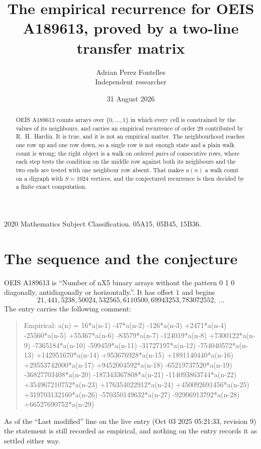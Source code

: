\documentclass[11pt,a4paper]{article}
\title{The empirical recurrence for OEIS A189613, proved by a two-line transfer matrix}
\author{Adrian Perez Fontelles\\ \small Independent researcher}
\date{31 August 2026}
\theoremstyle{plain}
\theoremstyle{definition}
\begin{document}
\maketitle

\begin{abstract}
OEIS A189613 counts arrays over $\{0,\dots,1\}$ in which every cell is constrained by the
values of its neighbours, and carries an empirical recurrence of order $29$ contributed
by R.~H.~Hardin. It is true, and it is not an empirical matter. The neighbourhood reaches one
row up and one row down, so a single row is not enough state and a plain walk count
is wrong; the right object is a walk on ordered \emph{pairs} of consecutive rows, where
each step tests the condition on the middle row against both its neighbours and the two
ends are tested with one neighbour row absent. That makes $a(n)$ a walk count on a digraph
with $S=1024$ vertices, and the conjectured recurrence is then decided by a finite exact
computation.
\end{abstract}

\noindent\small 2020 Mathematics Subject Classification. 05A15, 05B45, 15B36.\normalsize

\section{The sequence and the conjecture}

OEIS A189613 is ``Number of nX5 binary arrays without the pattern 0 1 0 diagonally, antidiagonally or horizontally.''. It has offset $1$ and begins
\[
21, 441, 5238, 50024, 532565, 6110500, 69943253, 783072552,\ \dots
\]
The entry carries the following comment:
\begin{quote}\small
Empirical: a(n) = 16*a(n-1) -47*a(n-2) -126*a(n-3) +2471*a(n-4) -25560*a(n-5) +55367*a(n-6) -83579*a(n-7) -124019*a(n-8) +7300122*a(n-9) -7365184*a(n-10) -599459*a(n-11) -31727197*a(n-12) -754040572*a(n-13) +142951670*a(n-14) +953676928*a(n-15) +1891140440*a(n-16) +29553742000*a(n-17) +9452004592*a(n-18) -65219737520*a(n-19) -36827703408*a(n-20) -187343367808*a(n-21) -114093863744*a(n-22) +354967210752*a(n-23) +176354022912*a(n-24) +450092691456*a(n-25) +319703132160*a(n-26) -570350149632*a(n-27) -92906913792*a(n-28) +66527690752*a(n-29)
\end{quote}
As of the ``Last modified'' line on the live entry (Oct 03 2025 05:21:33, revision 9) the statement is
still recorded as empirical, and nothing on the entry records it as settled either way.
\end{document}
